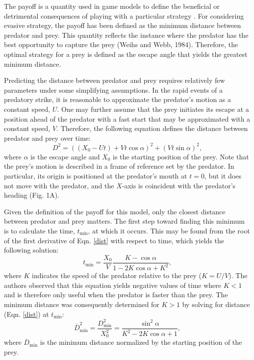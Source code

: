 \documentclass[12pt]{article}
\newcommand{\ol}{\overline}
\begin{document}
The payoff is a quantity used in game models to define the beneficial or detrimental consequences of playing with a particular strategy \citep{Webb:2007hg}. For considering evasive strategy, the payoff has been defined as the minimum distance between predator and prey. This quantity reflects the instance where the predator has the best opportunity to capture the prey (Weihs and Webb, 1984). Therefore, the optimal strategy for a prey is defined as the escape angle that yields the greatest minimum distance.

Predicting the distance between predator and prey requires relatively few parameters under some simplifying assumptions. In the rapid events of a predatory strike, it is reasonable to approximate the predator's motion as a constant speed, $U$. One may further assume that the prey initiates its escape at a position ahead of the predator with a fast start that may be approximated with a constant speed, $V$. Therefore, the following equation defines the distance between predator and prey over time:
%
\begin{equation}
D^2 = ((X_0 - Ut) + Vt\cos\alpha)^2 + (Vt\sin\alpha)^2,
\label{dist}
\end{equation}
%
where $\alpha$ is the escape angle and $X_0$ is the starting position of the prey. Note that the prey's motion is described in a frame of reference set by the predator. In particular, its origin is positioned at the predator's mouth at $t= 0$, but it does not move with the predator, and the $X$-axis is coincident with the predator's heading (Fig. 1A). 

Given the definition of the payoff for this model, only the closest distance between predator and prey matters. The first step toward finding this minimum is to calculate the time, $t_{\text{min}}$,  at which it occurs. This may be found from the root of the first derivative of Eqn. \ref{dist} with respect to time, which yields the following solution:
%
\begin{equation}
t_{\text{min}} = \frac{X_0}{V} \frac{K-\cos\alpha}{1-2 K\cos\alpha+K^2},
\label{eq33weihs}	
\end{equation}
%
where $K$ indicates the speed of the predator relative to the prey ($K = U/V$). The authors observed that this equation yields negative values of time where $K<1$ and is therefore only useful when the predator is faster than the prey. The minimum distance was consequently determined for $K>1$ by solving for distance (Eqn. \ref{dist}) at $t_{\text{min}}$:
%
\begin{equation}
\ol D_{\text{min}}^2 = \frac{D_{\text{min}}^2}{X_0^2} = \frac{\sin^2\alpha}{K^2 - 2K \cos\alpha + 1},
\label{dmin}
\end{equation}
where $\ol D_{\text{min}}$ is the minimum distance normalized by the starting position of the prey.
\end{document}
